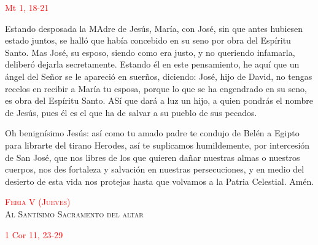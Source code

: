 \documentclass[10pt]{article}
\begin{document}
\begin{multicols}{2}
      \hfill\textcolor{red}{Mt 1, 18-21}

      Estando desposada la MAdre de Jesús, María, con José, sin que antes hubiesen estado juntos, se halló que había concebido en su seno por obra del Espíritu Santo. Mas José, su esposo,
      siendo como era justo, y no queriendo infamarla, deliberó dejarla secretamente. Estando él en este pensamiento, he aquí que un ángel del Señor se le apareció en suerños, diciendo:
      José, hijo de David, no tengas recelos en recibir a María tu esposa, porque lo que se ha engendrado en su seno, es obra del Espíritu Santo. ASí que dará a luz un hijo, a quien pondrás
      el nombre de Jesús, pues él es el que ha de salvar a su pueblo de sus pecados.\newline

      \begin{otherlanguage}{latin}
            

            

            

      \end{otherlanguage}
      \newline

      Oh benignísimo Jesús: así como tu amado padre te condujo de Belén a Egipto para librarte del tirano Herodes, así te suplicamos humildemente, por intercesión de San José, que nos libres
      de los que quieren dañar nuestras almas o nuestros cuerpos, nos des fortaleza y salvación en nuestras persecuciones, y en medio del desierto de esta vida nos protejas hasta que volvamos
      a la Patria Celestial. Amén.

      \begin{center}
            \textsc{\textcolor{red}{Feria V (Jueves)}\\ {\large Al Santísimo Sacramento del altar}}
      \end{center}

      \hfill\textcolor{red}{1 Cor 11, 23-29}


\end{multicols}
\end{document}
